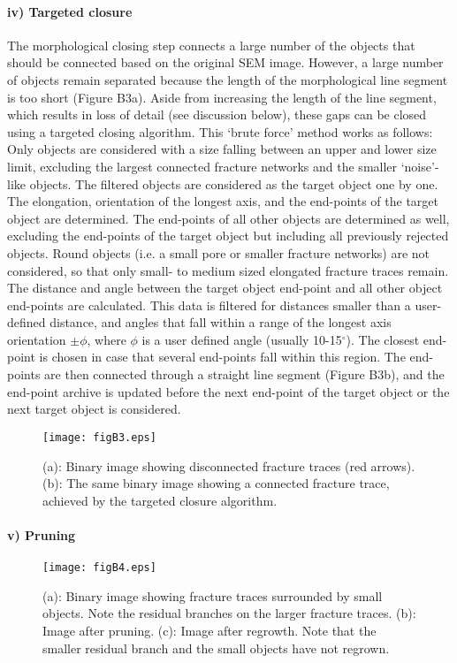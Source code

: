 \documentclass{article}
\begin{document}
\begin{multicols}{2}
\paragraph{iv) Targeted closure}
The morphological closing step connects a large number of the objects that should be connected based on the original SEM image. However, a large number of objects remain separated because the length of the morphological line segment is too short (Figure B3a). Aside from increasing the length of the line segment, which results in loss of detail (see discussion below), these gaps can be closed using a targeted closing algorithm. This `brute force' method works as follows: Only objects are considered with a size falling between an upper and lower size limit, excluding the largest connected fracture networks and the smaller `noise'-like objects. The filtered objects are considered as the target object one by one. The elongation, orientation of the longest axis, and the end-points of the target object are determined. The end-points of all other objects are determined as well, excluding the end-points of the target object but including all previously rejected objects. Round objects (i.e. a small pore or smaller fracture networks) are not considered, so that only small- to medium sized elongated fracture traces remain. The distance and angle between the target object end-point and all other object end-points are calculated. This data is filtered for distances smaller than a user-defined distance, and angles that fall within a range of the longest axis orientation $\pm \phi$, where $\phi$ is a user defined angle (usually 10-15$^{\circ}$). The closest end-point is chosen in case that several end-points fall within this region. The end-points are then connected through a straight line segment (Figure B3b), and the end-point archive is updated before the next end-point of the target object or the next target object is considered. 

\begin{figure*}
\centering
\texttt{[image: figB3.eps]}
\caption{(a): Binary image showing disconnected fracture traces (red arrows). (b): The same binary image showing a connected fracture trace, achieved by the targeted closure algorithm.}
\label{fig:B3}
\end{figure*} 

\paragraph{v) Pruning}
\begin{figure*}
\centering
\texttt{[image: figB4.eps]}
\caption{(a): Binary image showing fracture traces surrounded by small objects. Note the residual branches on the larger fracture traces. (b): Image after pruning. (c): Image after regrowth. Note that the smaller residual branch and the small objects have not regrown. }
\label{fig:B4}
\end{figure*} 


\end{multicols}
\end{document}
